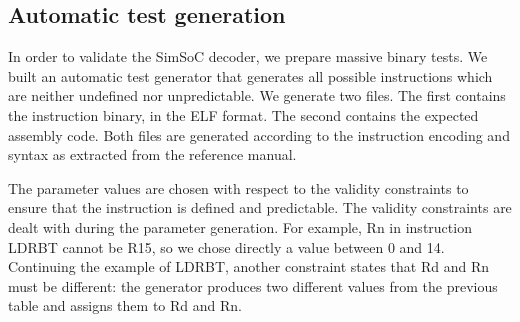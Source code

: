 \documentclass[conference]{ieeeconf}
\begin{document}
\subsection{Automatic test generation} %

In order to validate the SimSoC decoder, we prepare massive binary tests.
We built an automatic test generator that generates all possible instructions
which are neither undefined nor unpredictable.
We generate two files. The first contains the instruction binary, in the ELF
format. The second contains the expected assembly code.
Both files are generated according to the instruction encoding and syntax
as extracted from the reference manual.

The parameter values are chosen with respect to the validity constraints to
ensure that the instruction is defined and predictable.
The validity
constraints are dealt with during the parameter generation.
For example, {\stt
  Rn} in instruction {\stt LDRBT} cannot be {\stt R15}, so we chose directly a value
between 0 and 14.
Continuing the example of {\stt LDRBT}, another constraint states
that {\stt Rd} and {\stt Rn} must be different:
the generator produces two different values from the previous
table and assigns them to {\stt Rd} and {\stt Rn}.
\end{document}
